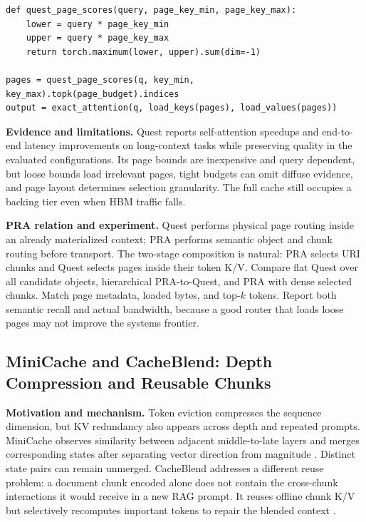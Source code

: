 \begin{lstlisting}[caption={Quest-style query bound over KV pages}]
def quest_page_scores(query, page_key_min, page_key_max):
    lower = query * page_key_min
    upper = query * page_key_max
    return torch.maximum(lower, upper).sum(dim=-1)

pages = quest_page_scores(q, key_min, key_max).topk(page_budget).indices
output = exact_attention(q, load_keys(pages), load_values(pages))
\end{lstlisting}

\textbf{Evidence and limitations.} Quest reports self-attention speedups and end-to-end
latency improvements on long-context tasks while preserving quality in the evaluated
configurations. Its page bounds are inexpensive and query dependent, but loose bounds load
irrelevant pages, tight budgets can omit diffuse evidence, and page layout determines
selection granularity. The full cache still occupies a backing tier even when HBM traffic
falls.

\textbf{PRA relation and experiment.} Quest performs physical page routing inside an
already materialized context; PRA performs semantic object and chunk routing before
transport. The two-stage composition is natural: PRA selects URI chunks and Quest selects
pages inside their token K/V. Compare flat Quest over all candidate objects, hierarchical
PRA-to-Quest, and PRA with dense selected chunks. Match page metadata, loaded bytes, and
top-$k$ tokens. Report both semantic recall and actual bandwidth, because a good router that
loads loose pages may not improve the systems frontier.

\subsection{MiniCache and CacheBlend: Depth Compression and Reusable Chunks}

\textbf{Motivation and mechanism.} Token eviction compresses the sequence dimension, but
KV redundancy also appears across depth and repeated prompts. MiniCache observes similarity
between adjacent middle-to-late layers and merges corresponding states after separating
vector direction from magnitude \citep{liu2024minicache}. Distinct state pairs can remain
unmerged. CacheBlend addresses a different reuse problem: a document chunk encoded alone
does not contain the cross-chunk interactions it would receive in a new RAG prompt. It
reuses offline chunk K/V but selectively recomputes important tokens to repair the blended
context \citep{yao2024cacheblend}.


